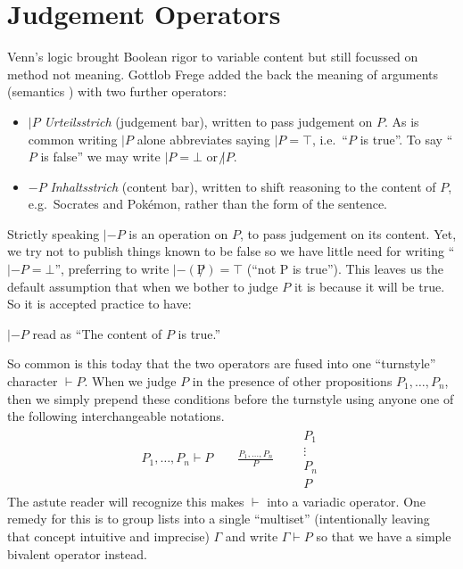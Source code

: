 \section{Judgement Operators}
Venn's logic brought Boolean rigor to variable content but still focussed 
on method not meaning.  Gottlob Frege added the back the meaning of arguments
(semantics ) with two further operators:
\begin{itemize}
    \item $|P$ \emph{Urteilsstrich} (judgement bar), written to pass judgement 
    on $P$.  As is common writing $|P$ alone abbreviates saying $|P=\top$, i.e.\
     ``$P$ is true''.  To say ``$P$ is false'' we may write $|P=\bot$ or $\not| P$.

    \item $-P$ \emph{Inhaltsstrich} (content bar), written to shift reasoning 
    to the content of $P$, e.g.\ Socrates and Pok\'emon, rather than the 
    form of the sentence.
\end{itemize}
Strictly speaking $|-P$ is an operation on $P$, to pass judgement on its content.
Yet, we try not to publish things known to be false so we have little need for 
writing ``$|-P=\bot$'', preferring to write $|- (\not P)=\top$ (``not P is true'').
This leaves us the default assumption that when we bother to 
judge $P$ it is because it will be true.  So it is accepted practice to have:
\begin{center}
    $|-P$ read as ``The content of $P$ is true.'' 
\end{center}
So common is this today that the two operators are fused into one
``turnstyle'' character $\vdash P$.  When we judge $P$ in the presence of 
other propositions $P_1,\ldots, P_n$, then we simply prepend these conditions before the turnstyle 
using anyone one of the following interchangeable notations.
\begin{gather*}
    P_1,\ldots,P_n\vdash P 
    \qquad 
    \frac{P_1,\ldots,P_n}{P}
    \qquad 
    \begin{array}{c}
        P_1\\ \vdots \\ P_n\\ \hline P 
    \end{array}
\end{gather*}
The astute reader will recognize this makes $\vdash$ into a variadic operator.
One remedy for this is to group lists into a single ``multiset'' (intentionally leaving 
that concept intuitive and imprecise) $\Gamma$ and write $\Gamma\vdash P$ so that we have a 
simple bivalent operator instead.

